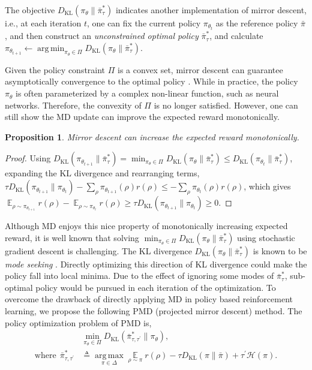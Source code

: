 \documentclass{article}
\DeclareMathOperator*\argmin{arg\,min}
\DeclareMathOperator*\argmax{arg\,max}
\DeclareMathOperator*\ep{\mathbb{E}}
\newcommand*{\refPi}{\bar{\pi}}
\newcommand*{\cH}{\mathcal{H}}
\newcommand{\KL}{D_{\text{KL}}}
\newcommand{\pithetat}{\pi_{\theta_t}}
\newtheorem{prop}{Proposition}
\begin{document}
The objective $\KL(\pi_\theta \| \bar{\pi}_\tau^*)$ indicates another implementation of mirror descent, i.e., at each iteration $t$, one can fix the current policy $\pithetat$ as the reference policy $\refPi$, and then construct an \emph{unconstrained optimal policy} $\bar{\pi}_\tau^*$, and calculate $\pi_{\theta_{t+1}} \leftarrow \argmin_{\pi_\theta \in \Pi}{ \KL(\pi_\theta \| \bar{\pi}_\tau^*) }$. 


Given the policy constraint $\Pi$ is a convex set, mirror descent can guarantee asymptotically convergence to the optimal policy \cite{}. While in practice, the policy $\pi_\theta$ is often parameterized by a complex non-linear function, such as neural networks. Therefore, the convexity of $\Pi$ is no longer satisfied. However, one can still show the MD update can improve the expected reward monotonically.

\begin{prop}
Mirror descent can increase the expected reward monotonically. 
\end{prop}
\begin{proof}
Using $\KL(\pi_{\theta_{t+1}} \| \bar{\pi}_\tau^*)  = \min_{\pi_\theta \in \Pi}{ \KL(\pi_\theta \| \bar{\pi}_\tau^*)} \leq \KL(\pi_{\theta_{t}} \| \bar{\pi}_\tau^*)$, expanding the KL divergence and rearranging terms, $ \tau \KL(\pi_{\theta_{t+1}} \| \pi_{\theta_{t}}) - \sum_{\rho}{ \pi_{\theta_{t+1}}(\rho) r(\rho) } \leq - \sum_{\rho}{ \pi_{\theta_{t}}(\rho) r(\rho) }$, which gives $\ep_{\rho \sim \pi_{\theta_{t+1}}}{  r(\rho)} - \ep_{\rho \sim \pi_{\theta_{t}}}{  r(\rho)} \geq \tau \KL(\pi_{\theta_{t+1}} \| \pi_{\theta_{t}}) \geq 0$.
\end{proof}

Although MD enjoys this nice property of monotonically increasing expected reward, it is well known that solving $\min_{\pi_\theta \in \Pi}{\KL(\pi_\theta \| \bar{\pi}_\tau^*)  } $ using stochastic gradient descent is challenging. The KL divergence $\KL(\pi_\theta \| \bar{\pi}_\tau^*) $ is known to be \emph{mode seeking} \cite{kevin2012machine}. Directly optimizing this direction of KL divergence could make the policy fall into local minima. Due to the effect of ignoring some modes of $\bar{\pi}_\tau^*$, sub-optimal policy would be pursued in each iteration of the optimization. To overcome the drawback of directly applying MD in policy based reinforcement learning, we propose the following PMD (projected mirror descent) method. The policy optimization problem of PMD is,
\begin{equation}
\label{pmd_obj}
\begin{split}
	&\min\limits_{\pi_\theta \in \Pi}{\KL(\bar{\pi}_{\tau,\tau^{\prime}}^* \| \pi_\theta) }, \\
	\text{where}\ \ \bar{\pi}_{\tau,\tau^{\prime}}^* &\triangleq \argmax\limits_{\pi \in \Delta}{ \ep\limits_{\rho \sim \pi}{  r(\rho)  - \tau \KL(\pi \| \refPi) + \tau^{\prime} \cH(\pi)} }.
\end{split}
\end{equation}
\end{document}
